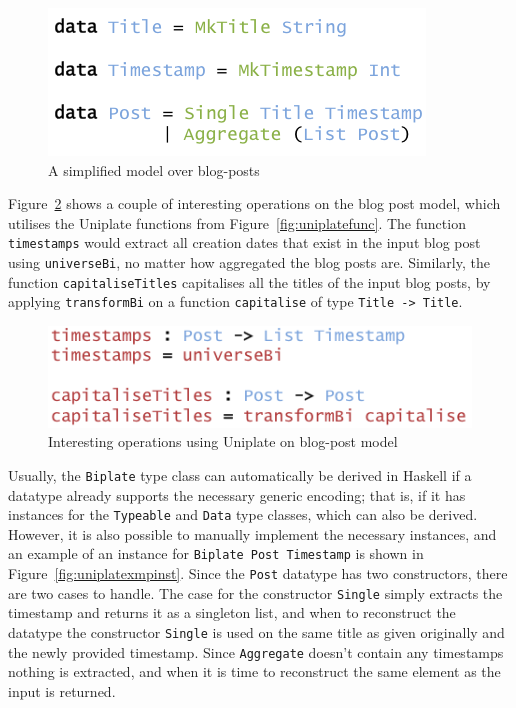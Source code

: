 \documentclass{ituthesis}
\newcommand{\ttconstructor}[1]{\textcolor{constructor-color}{\texttt{#1}}}
\newcommand{\tttype}[1]{\textcolor{type-color}{\texttt{#1}}}
\newcommand{\ttdec}[1]{\textcolor{declared-var-color}{\texttt{#1}}}
\theoremstyle{break}
\begin{document}
\begin{figure}[ht]
\begin{center}
    \includegraphics[scale=0.5]{Figures/UniplateExampleData.png}
\end{center}
\caption{A simplified model over blog-posts}
\label{fig:uniplateexmpdata}
\end{figure}

Figure~\ref{fig:uniplateexmpops} shows a couple of interesting operations on the blog post model, which utilises the Uniplate functions from Figure~\ref{fig:uniplatefunc}.
The function \ttdec{timestamps} would extract all creation dates that exist in the input blog post using \ttdec{universeBi}, no matter how aggregated the blog posts are.
Similarly, the function \ttdec{capitaliseTitles} capitalises all the titles of the input blog posts, by applying \ttdec{transformBi} on a function \ttdec{capitalise} of type \tttype{Title}\texttt{~->~}\tttype{Title}.

\begin{figure}[ht]
\begin{center}
    \includegraphics[scale=0.5]{Figures/UniplateExampleOperations.png}
\end{center}
\caption{Interesting operations using Uniplate on blog-post model}
\label{fig:uniplateexmpops}
\end{figure}

Usually, the \tttype{Biplate} type class can automatically be derived in Haskell if a datatype already supports the necessary generic encoding; that is, if it has instances for the \tttype{Typeable} and \tttype{Data} type classes, which can also be derived.
However, it is also possible to manually implement the necessary instances, and an example of an instance for \tttype{Biplate}~\tttype{Post}~\tttype{Timestamp} is shown in Figure~\ref{fig:uniplatexmpinst}.
Since the \tttype{Post} datatype has two constructors, there are two cases to handle.
The case for the constructor \ttconstructor{Single} simply extracts the timestamp and returns it as a singleton list, and when to reconstruct the datatype the constructor \ttconstructor{Single} is used
on the same title as given originally and the newly provided timestamp.
Since \ttconstructor{Aggregate} doesn't contain any timestamps nothing is extracted, and when it is time to reconstruct the same element as the input is returned.
\end{document}
